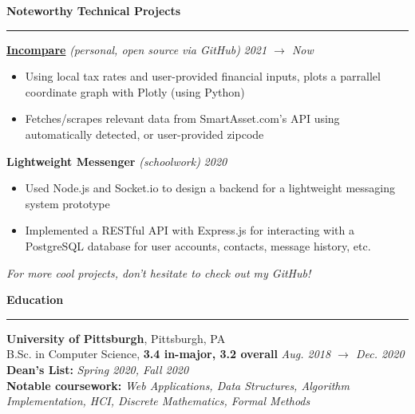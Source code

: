 \documentclass[10pt]{article}
\begin{document}
\begin{flushleft}
		\vspace{2mm}
		{\large \raggedright \textbf{Noteworthy Technical Projects}}
		\vspace{1.25mm}
	
		\hrule
	
		\vspace{2.25mm}
		\textbf{\href{https://github.com/avigloz/incompare}{Incompare}} \textit{(personal, open source via GitHub)} \hfill \textit{\small 2021 $\rightarrow$ Now}
		\vspace{-2mm}
		\begin{itemize}
			\item Using local tax rates and user-provided financial inputs, plots a parrallel coordinate graph with Plotly (using Python)
			\vspace{-2mm}
			\item Fetches/scrapes relevant data from SmartAsset.com's API using automatically detected, or user-provided zipcode
		\end{itemize}
		\vspace{-1.5mm}
		\textbf{Lightweight Messenger} \textit{(schoolwork)} \hfill \textit{\small 2020}
		\vspace{-2mm}
		\begin{itemize}
			\item Used Node.js and Socket.io to design a backend for a lightweight messaging system prototype
			\vspace{-2mm}
			\item Implemented a RESTful API with Express.js for interacting with a PostgreSQL database for user accounts, contacts, message history, etc.
		\end{itemize}
		\vspace{-1.25mm}
		{\footnotesize \textit{For more cool projects, don't hesitate to check out my GitHub!}}

		\vspace{2mm}
		{\large \raggedright \textbf{Education}}
		\vspace{1.25mm}
	
		\hrule
		
		\vspace{2.25mm}
		\textbf{University of Pittsburgh}, Pittsburgh, PA\\
      	{\small B.Sc. in Computer Science, \textbf{3.4 in-major, 3.2 overall} \hfill \textit{Aug. 2018 $\rightarrow$ Dec. 2020}}\\
		{\small \textbf{Dean's List:} \textit{Spring 2020, Fall 2020}}\\
		{\small \textbf{Notable coursework:} \textit{Web Applications, Data Structures, Algorithm Implementation, HCI, Discrete Mathematics, Formal Methods}}


\end{flushleft}
\end{document}

